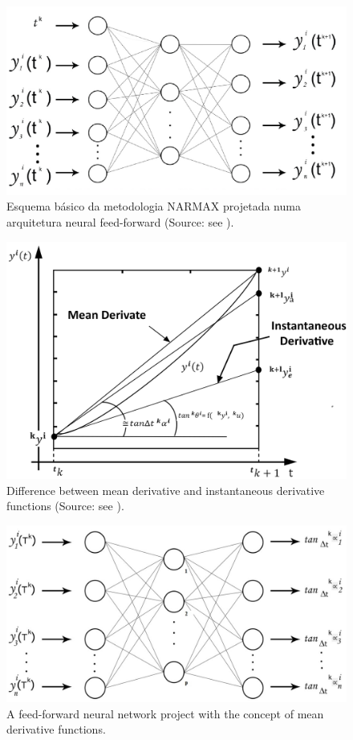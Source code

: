 \documentclass[journal,article,submit,pdftex,moreauthors]{Definitions/mdpi}
\begin{document}
 \begin{figure}[htb]
	\centering
	\includegraphics[scale=0.35]{Definitions/figure1.png}
	\caption{Esquema básico da metodologia NARMAX projetada numa arquitetura neural feed-forward (Source: see \cite{ref5, ref6}).}	
	\label{fig1}
\end{figure}

\begin{figure}[htb]
	\centering
	\includegraphics[scale=0.17]{Definitions/figure2.png}
	\caption{Difference between mean derivative and instantaneous derivative functions (Source: see \cite{ref7, ref8}).}
	\label{fig2}
\end{figure}

\begin{figure}[htb]
\centering
\includegraphics[scale=0.46]{Definitions/figure3.png}
\caption{A feed-forward neural network project with the concept of mean derivative functions.}
\label{fig3}
\end{figure}
\end{document}
